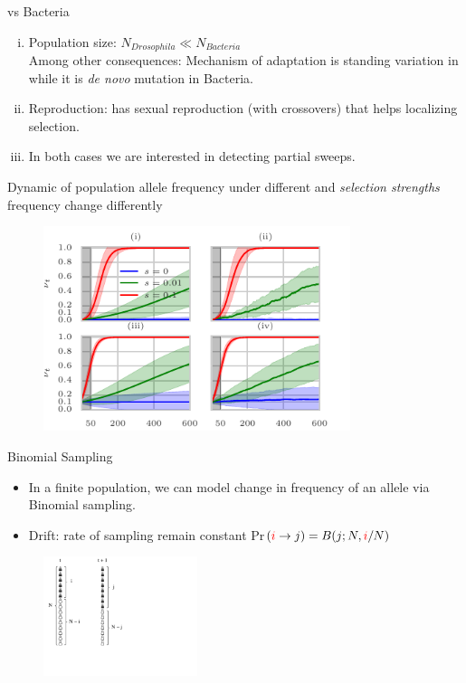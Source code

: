 \documentclass[t]{beamer} %
\begin{document}
\begin{frame}{\dmel vs Bacteria}
	\begin{enumerate}[(i)]
		\item Population size: $N_{Drosophila}\ll N_{Bacteria}$\\
			Among other consequences: Mechanism of adaptation is standing 
			variation in \dmel while it is \emph{ de novo} mutation in Bacteria.
		\item Reproduction: \dmel has sexual reproduction (with crossovers) 
		that helps localizing selection.
		\item In both cases we are interested in detecting partial sweeps.
	\end{enumerate}
\end{frame}

\begin{frame}{Dynamic of population allele frequency}
	under different  and \emph{selection strengths} 
	frequency 
	change differently
	\begin{figure}
		\includegraphics[trim={0in 0.0in 0.0in 
			0in},clip,width=0.8\textwidth]{../figures/AF.pdf}
	\end{figure}
\end{frame}
\begin{frame}{ Binomial Sampling}
	\begin{itemize}
		\item 	In a finite population, we can model change in frequency of an 
		allele via Binomial sampling.
		\item Drift: rate of sampling remain constant  
		Pr$(\textcolor{red}{i}\rightarrow 
		j)=B(j;N,\textcolor{red}{i}/N)$
	\end{itemize}

	\begin{figure}
		\includegraphics[trim={.05in 0in 5.0in 
			0.in},clip,width=0.4\textwidth]{../figures/drift.pdf}
	\end{figure}
\end{frame}	
\end{document}
